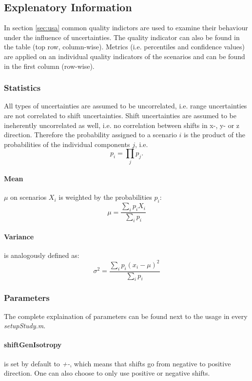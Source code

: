 \documentclass[a4paper]{scrartcl}
\begin{document}
\subsection{Explenatory Information}
In section \ref{sec:usa} common quality indictors are used to examine their behaviour under the influence of uncertainties. 
The quality indicator can also be found in the table (top row, column-wise).
Metrics (i.e. percentiles and confidence values) are applied on an individual quality indicators of the scenarios and can be found in the first column (row-wise).

\subsubsection{Statistics}
All types of uncertainties are assumed to be uncorrelated, i.e. range uncertainties are not correlated to shift uncertainties.
Shift uncertainties are assumed to be ineherently uncorrelated as well, i.e. no correlation between shifts in x-, y- or z direction.
Therefore the probability assigned to a scenario $i$ is the product of the probabilities of the individual components $j$, i.e.
\begin{equation}
  p_i = \prod\limits_j p_j.
\end{equation}
 
\paragraph{Mean} $\mu$ on scenarios $X_i$ is weighted by the probabilities $p_i$:
\begin{equation}
  \mu = \frac{\sum\limits_{i} p_i X_i}{\sum\limits_{i} p_i}
\end{equation}
 
\paragraph{Variance} is analogously defined as:
\begin{equation}
	\sigma^2 = \frac{\sum\limits_{i} p_{i}\left(x_{i}-\mu\right)^{2}}{\sum\limits _{i}p_{i}}
\end{equation}

\subsubsection{Parameters}
The complete explaination of parameters can be found next to the usage in every \textit{setupStudy.m}.
\paragraph{shiftGenIsotropy} is set by default to \textit{+-}, which means that shifts go from negative to positive direction.
One can also choose to only use positive or negative shifts.
\end{document}
